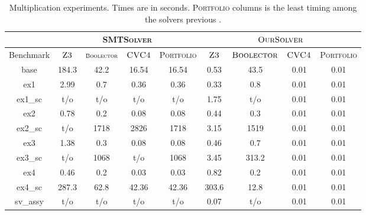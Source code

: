 \begin{table}[t]
\centering
\caption{Multiplication experiments. Times are in seconds.
\textsc{Portfolio} columns is the least timing among the solvers previous .}
\label{my-label}
\begin{tabular}{|c|c|c|c|c|c|c|c|c|}
\hline
                      & \multicolumn{4}{c|}{\textsc{SMTSolver}}                    & \multicolumn{4}{c|}{$\textsc{OurSolver}$}                              \\ \hline
Benchmark             & {\scriptsize $\textsc{Z3}$} & ${\scriptsize \textsc{Boolector}}$ & {\scriptsize $\textsc{CVC4}$} & {\scriptsize \textsc{Portfolio}} & {\scriptsize $\textsc{Z3}$} & {\scriptsize $\textsc{Boolector}$} & {\scriptsize $\textsc{CVC4}$} & {\scriptsize \textsc{Portfolio}} \\ \hline
base                  & 184.3    & 42.2         & 16.54      & 16.54                & 0.53      & 43.5         & 0.01       & 0.01                 \\ \hline
ex1                   & 2.99      & 0.7          & 0.36       & 0.36                 & 0.33      & 0.8          & 0.01       & 0.01                 \\ \hline
ex1\_sc         & t/o       & t/o          & t/o        & t/o                  & 1.75      & t/o          & 0.01       & 0.01                 \\ \hline
ex2                   & 0.78      & 0.2          & 0.08       & 0.08                 & 0.44      & 0.3          & 0.01       & 0.01                 \\ \hline
ex2\_sc         & t/o       & 1718       & 2826    & 1718               & 3.15      & 1519       & 0.01       & 0.01                 \\ \hline
ex3                   & 1.38      & 0.3          & 0.08       & 0.08                 & 0.46      & 0.7          & 0.01       & 0.01                 \\ \hline
ex3\_sc         & t/o       & 1068       & t/o        & 1068               & 3.45      & 313.2        & 0.01       & 0.01                 \\ \hline
ex4         & 0.46      & 0.2          & 0.03       & 0.03                 & 0.82      & 0.2          & 0.01       & 0.01                 \\ \hline
ex4\_sc     & 287.3    & 62.8         & 42.36      & 42.36                & 303.6    & 12.8         & 0.01       & 0.01                 \\ \hline
sv\_assy              & t/o       & t/o          & t/o        & t/o                  & 0.07      & t/o          & 0.01       & 0.01                 \\ \hline

\end{tabular}
\end{table}
